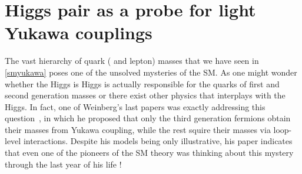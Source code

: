 
\chapter{ Higgs pair as a probe for light Yukawa couplings }\label{chap:lightyuk}
The vast hierarchy of quark  ( and lepton) masses that we have seen in~ \autoref{smyukawa} poses one of the unsolved mysteries of the SM. As one might wonder whether the Higgs is Higgs is actually responsible for the quarks of first and second generation masses or there exist other physics that interplays with the Higgs. In fact, one of Weinberg's last papers was exactly addressing this question~\cite{Weinberg:2020zba}, in which he proposed that only the third generation fermions obtain their masses from Yukawa coupling, while the rest squire their masses via loop-level interactions. Despite his models being only illustrative, his paper indicates that even one of the pioneers of the SM theory was thinking about this mystery through the last year of his life !  \\
